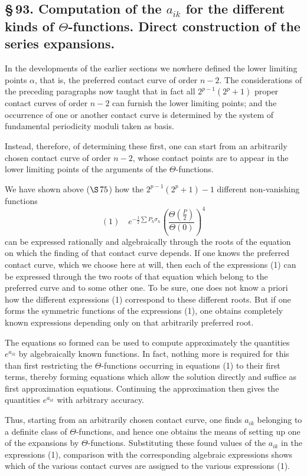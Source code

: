 \documentclass[10pt]{article}
\begin{document}
\subsection*{\S\,93. Computation of the \(a_{ik}\) for the different kinds of \(\Theta\)-functions. Direct construction of the series expansions.}

In the developments of the earlier sections we nowhere defined the lower limiting points \(\alpha\), that is, the preferred contact curve of order \(n-2\). The considerations of the preceding paragraphs now taught that in fact all \(2^{p-1}(2^p+1)\) proper contact curves of order \(n-2\) can furnish the lower limiting points; and the occurrence of one or another contact curve is determined by the system of fundamental periodicity moduli taken as basis.

Instead, therefore, of determining these first, one can start from an arbitrarily chosen contact curve of order \(n-2\), whose contact points are to appear in the lower limiting points of the arguments of the \(\Theta\)-functions.

We have shown above (\(\S\,75\)) how the \(2^{p-1}(2^p+1)-1\) different non-vanishing functions
\[
(1)\quad
e^{-\frac12\sum P_h\sigma_h}\left(\frac{\Theta\left(\frac P2\right)}{\Theta(0)}\right)^4
\]
can be expressed rationally and algebraically through the roots of the equation on which the finding of that contact curve depends. If one knows the preferred contact curve, which we choose here at will, then each of the expressions (1) can be expressed through the two roots of that equation which belong to the preferred curve and to some other one. To be sure, one does not know a priori how the different expressions (1) correspond to these different roots. But if one forms the symmetric functions of the expressions (1), one obtains completely known expressions depending only on that arbitrarily preferred root.

The equations so formed can be used to compute approximately the quantities \(e^{a_{ik}}\) by algebraically known functions. In fact, nothing more is required for this than first restricting the \(\Theta\)-functions occurring in equations (1) to their first terms, thereby forming equations which allow the solution directly and suffice as first approximation equations. Continuing the approximation then gives the quantities \(e^{a_{ik}}\) with arbitrary accuracy.

Thus, starting from an arbitrarily chosen contact curve, one finds \(a_{ik}\) belonging to a definite class of \(\Theta\)-functions, and hence one obtains the means of setting up one of the expansions by \(\Theta\)-functions. Substituting these found values of the \(a_{ik}\) in the expressions (1), comparison with the corresponding algebraic expressions shows which of the various contact curves are assigned to the various expressions (1).
\end{document}

